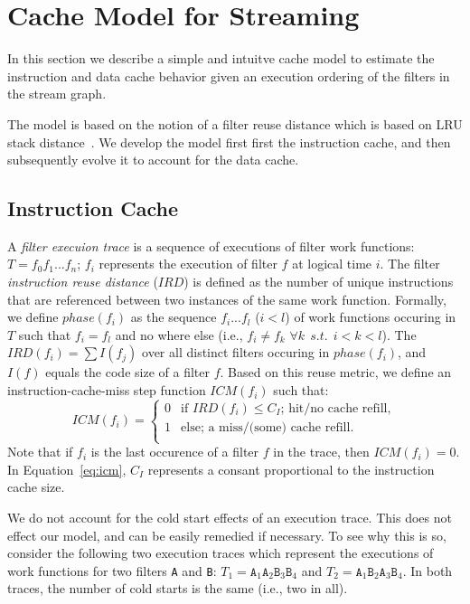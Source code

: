 \section{Cache Model for Streaming}
\label{sec:cache-model}

In this section we describe a simple and intuitve cache model to
estimate the instruction and data cache behavior given an execution
ordering of the filters in the stream graph.

The model is based on the notion of a filter reuse distance which is 
based on LRU stack distance~\cite{mattson-reuse}. We develop the model
first first the instruction cache, and then subsequently evolve it to
account for the data cache.

\subsection{Instruction Cache}

A {\it filter execuion trace} is a sequence of executions of
filter work functions: $T = f_0 f_1 ... f_n$; $f_i$ represents the
execution of filter $f$ at logical time $i$.
The filter {\it instruction reuse distance} ($IRD$) is defined as the
number of unique instructions that are referenced between two
instances of the same work function. Formally, we define $phase(f_i)$
as the sequence $f_i ... f_l$ ($i < l$) of work functions occuring in
$T$ such that $f_i = f_l$ and no where else (i.e., $f_i \neq f_k$
$\forall{k}~~s.t.~~i < k < l$). The $IRD(f_i) = \sum I(f_j)$ over all
distinct filters occuring in $phase(f_i)$, and $I(f)$ equals the code
size of a filter $f$. Based on this reuse metric, we define an
instruction-cache-miss step function $ICM(f_i)$ such that:
\begin{equation}
\label{eq:icm}
  ICM(f_i) =
    \begin{cases}
      0& \text{if $IRD(f_i) \leq C_I$; hit/no cache refill},\\
      1& \text{else; a miss/(some) cache refill}.\\
    \end{cases}
\end{equation}
Note that if $f_i$ is the last occurence of a filter $f$ in the trace,
then $ICM(f_i) = 0$. In Equation~\ref{eq:icm}, $C_I$ represents a
consant proportional to the instruction cache size.

We do not account for the cold start
effects of an execution trace. This does not effect our model, and can
be easily remedied if necessary. To see why this is so, consider the
following two execution traces which represent the executions of work
functions for two filters \texttt{A} and \texttt{B}:
$T_1 = \texttt{A}_1\texttt{A}_2\texttt{B}_3\texttt{B}_4$
and 
$T_2 = \texttt{A}_1\texttt{B}_2\texttt{A}_3\texttt{B}_4$.
In both 
traces, the number of cold starts is the same (i.e., two in all).

